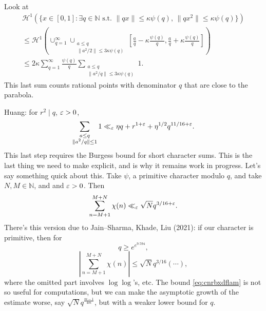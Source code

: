 \documentclass[reqno]{amsart} 
\numberwithin{theorem}{section}
\numberwithin{equation}{section}
\begin{document}
Look at
\begin{multline*}
  \mathcal{H}^1 \left( \{x \in[0, 1] : \exists q \in \mathbb{N} \text{ s.t. } \lVert q x \rVert \leq \kappa \psi(q),
    \,
    \lVert q x^2 \rVert \leq \kappa \psi(q)\} \right)
  \\
  \leq \mathcal{H}^1 \left( \cup_{q = 1}^\infty \cup_{
      \substack{
        a \leq q  \\
        \lVert a^2 / 2 \rVert \leq 3 \kappa \psi(q)        
      }
    }
    \left[ \frac{a}{q} - \kappa \frac{\psi(q)}{q},
      \frac{a}{q} + \kappa \frac{\psi(q)}{q}\right]\right) \\
  \leq 2 \kappa \sum_{q = 1}^\infty \frac{\psi(q)}{q} \sum_{
    \substack{
      a \leq q  \\
      \lVert a^2 / q \rVert \leq 3 \kappa \psi(q)      
    }
  } 1.
\end{multline*}
This last sum counts rational points with denominator $q$ that are close to the parabola.

Huang: for $r^2 \mid q$, $\varepsilon > 0$,
\begin{equation*}
  \sum_{
    \substack{
      a \leq q  \\
      \lVert a^2 / q \rVert \leq 1      
    }
  } 1
  \ll_\varepsilon \eta q + r^{1 + \varepsilon} + \eta^{1/2} q^{11/16 + \varepsilon}.
\end{equation*}
This last step requires the Burgess bound for short character sums.  This is the last thing we need to make explicit, and is why it remains work in progress.  Let's say something quick about this.  Take $\psi$, a primitive character modulo $q$, and take $N, M \in \mathbb{N}$, and and $\varepsilon > 0$.  Then
\begin{equation*}
  \sum_{n = M + 1}^{M + N} \chi(n) \ll_\varepsilon \sqrt{N} q^{3/16 + \varepsilon}.
\end{equation*}
There's this version due to Jain--Sharma, Khade, Liu (2021): if our character is primitive, then for
\begin{equation}\label{eq:cnrbxdflam}
  q \geq e^{e^{9.594}},
\end{equation}
\begin{equation*}
  \left| \sum_{n = M + 1}^{M + N} \chi(n) \right| \leq \sqrt{N} q^{3/16} \left( \dotsb \right),
\end{equation*}
where the omitted part involves $\log \log$'s, etc.  The bound \eqref{eq:cnrbxdflam} is not so useful for computations, but we can make the asymptotic growth of the estimate worse, say $\sqrt{N} q^{\frac{m - 1}{4 m}}$, but with a weaker lower bound for $q$.
\end{document}
